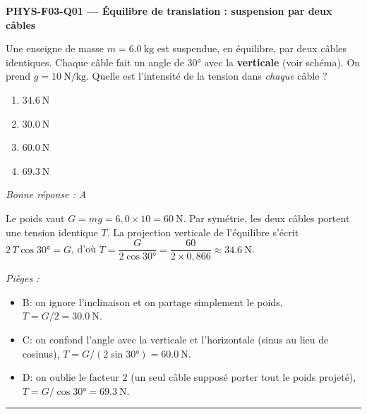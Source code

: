 \documentclass[11pt,a4paper]{article}
\newcommand{\vv}[1]{\vec{#1}}\newcommand{\ds}{\displaystyle}
\begin{document}
\noindent\textbf{PHYS-F03-Q01 --- Équilibre de translation : suspension par deux câbles}\par
Une enseigne de masse $m = \qty{6.0}{\kilogram}$ est suspendue, en équilibre, par deux câbles
identiques. Chaque câble fait un angle de \ang{30} avec la \textbf{verticale} (voir schéma). On prend
$g = \qty{10}{\newton\per\kilogram}$. Quelle est l'intensité de la tension dans \emph{chaque} câble ?
\begin{center}
\end{center}
\begin{enumerate}[label=\Alph*)]
\item $\qty{34.6}{\newton}$
\item $\qty{30.0}{\newton}$
\item $\qty{60.0}{\newton}$
\item $\qty{69.3}{\newton}$
\end{enumerate}
\textit{Bonne réponse : A}\par
Le poids vaut $G = mg = 6{,}0\times 10 = \qty{60}{\newton}$. Par symétrie, les deux câbles portent une
tension identique $T$. La projection verticale de l'équilibre s'écrit $2\,T\cos\ang{30} = G$, d'où
$T = \dfrac{G}{2\cos\ang{30}} = \dfrac{60}{2\times 0{,}866} \approx \qty{34.6}{\newton}$.\par
\textit{Pièges :}
\begin{itemize}
\item B: on ignore l'inclinaison et on partage simplement le poids, $T = G/2 = \qty{30.0}{\newton}$.
\item C: on confond l'angle avec la verticale et l'horizontale (sinus au lieu de cosinus), $T = G/(2\sin\ang{30}) = \qty{60.0}{\newton}$.
\item D: on oublie le facteur $2$ (un seul câble supposé porter tout le poids projeté), $T = G/\cos\ang{30} = \qty{69.3}{\newton}$.
\end{itemize}
\vspace{8pt}\hrule\vspace{8pt}
\end{document}
